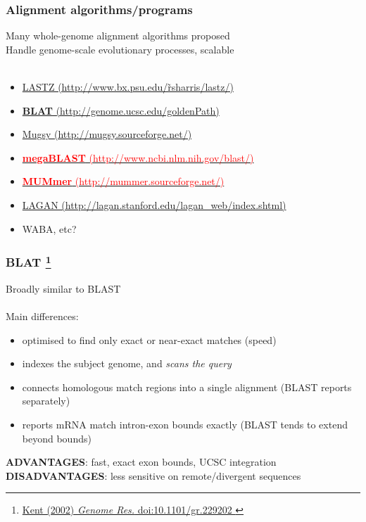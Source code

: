 %
\begin{frame}
  \frametitle{Alignment algorithms/programs}
  \textcolor{hutton_green}{Many whole-genome alignment algorithms proposed} \\
  Handle genome-scale evolutionary processes, scalable \\~\\
  \begin{itemize}
    \item \href{http://www.bx.psu.edu/~rsharris/lastz/}{LASTZ (http://www.bx.psu.edu/\~rsharris/lastz/)}
    \item \href{http://genome.ucsc.edu/goldenPath/help/blatSpec.html}{\textcolor{hutton_blue}{\textbf{BLAT} (http://genome.ucsc.edu/goldenPath)}}
    \item \href{http://mugsy.sourceforge.net/}{Mugsy (http://mugsy.sourceforge.net/)}
    \item \href{http://www.ncbi.nlm.nih.gov/blast/html/megablast.html}{\textcolor{red}{\textbf{megaBLAST} (http://www.ncbi.nlm.nih.gov/blast/)}}
    \item \href{http://mummer.sourceforge.net/}{\textcolor{red}{\textbf{MUMmer} (http://mummer.sourceforge.net/)}}
    \item \href{http://lagan.stanford.edu/lagan_web/index.shtml}{LAGAN (http://lagan.stanford.edu/lagan\_web/index.shtml)}
    \item WABA, etc?
  \end{itemize}
\end{frame}

%
\begin{frame}
  \frametitle{BLAT
  \footnote{\tiny{\href{http://dx.doi.org/10.1101/gr.229202
}{Kent (2002) \textit{Genome Res.} doi:10.1101/gr.229202
}}}
  }
  Broadly similar to BLAST \\~\\
  \textcolor{hutton_blue}{Main differences:}
  \begin{itemize}
    \item optimised to find \textcolor{hutton_purple}{only exact or near-exact matches} (speed)
    \item indexes the subject genome, and \textcolor{hutton_purple}{\textit{scans the query}}
    \item connects homologous match regions into a single alignment (BLAST reports separately)
    \item reports mRNA match intron-exon bounds exactly (BLAST tends to extend beyond bounds)
  \end{itemize}
  \textcolor{hutton_green}{\textbf{ADVANTAGES}: fast, exact exon bounds, UCSC integration}
  \textcolor{RawSienna}{\textbf{DISADVANTAGES}: less sensitive on remote/divergent sequences}
\end{frame}

